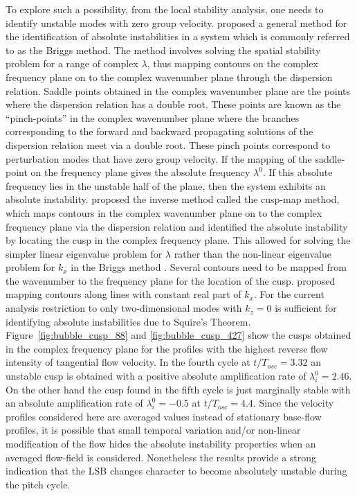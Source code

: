 To explore such a possibility, from the local stability analysis, one needs to identify unstable modes with zero group velocity. \cite{briggs64} proposed a general method for the identification of absolute instabilities in a system which is commonly referred to as the Briggs method. The method involves solving the spatial stability problem for a range of complex $\lambda$, thus mapping contours on the complex frequency plane on to the complex wavenumber plane through the dispersion relation. Saddle points obtained in the complex wavenumber plane are the points where the dispersion relation has a double root. These points are known as the ``pinch-points'' in the complex wavenumber plane where the branches corresponding to the forward and backward propagating solutions of the dispersion relation meet via a double root. These pinch points correspond to perturbation modes that have zero group velocity. If the mapping of the saddle-point on the frequency plane gives the absolute frequency $\lambda^{0}$. If this absolute frequency lies in the unstable half of the plane, then the system exhibits an absolute instability. \cite{kupfer87} proposed the inverse method called the cusp-map method, which maps contours in the complex wavenumber plane on to the complex frequency plane via the dispersion relation and identified the absolute instability by locating the cusp in the complex frequency plane. This allowed for solving the simpler linear eigenvalue problem for $\lambda$ rather than the non-linear eigenvalue problem for $k_{x}$ in the Briggs method \citep{briggs64}. Several contours need to be mapped from the wavenumber to the frequency plane for the location of the cusp. \cite{kupfer87} proposed mapping contours along lines with constant real part of $k_{x}$. For the current analysis restriction to only two-dimensional modes with $k_{z}=0$ is sufficient for identifying absolute instabilities due to Squire's Theorem. Figure~\ref{fig:bubble_cusp_88} and \ref{fig:bubble_cusp_427} show the cusps obtained in the complex frequency plane for the profiles with the highest reverse flow intensity of tangential flow velocity. In the fourth cycle at $t/T_{osc}=3.32$ an unstable cusp is obtained with a positive absolute amplification rate of $\lambda^{0}_{i}=2.46$. On the other hand the cusp found in the fifth cycle is just marginally stable with an absolute amplification rate of $\lambda^{0}_{i}=-0.5$ at $t/T_{osc}=4.4$. Since the velocity profiles considered here are averaged values instead of stationary base-flow profiles, it is possible that small temporal variation and/or non-linear modification of the flow hides the absolute instability properties when an averaged flow-field is considered. Nonetheless the results provide a strong indication that the LSB changes character to become absolutely unstable during the pitch cycle.

